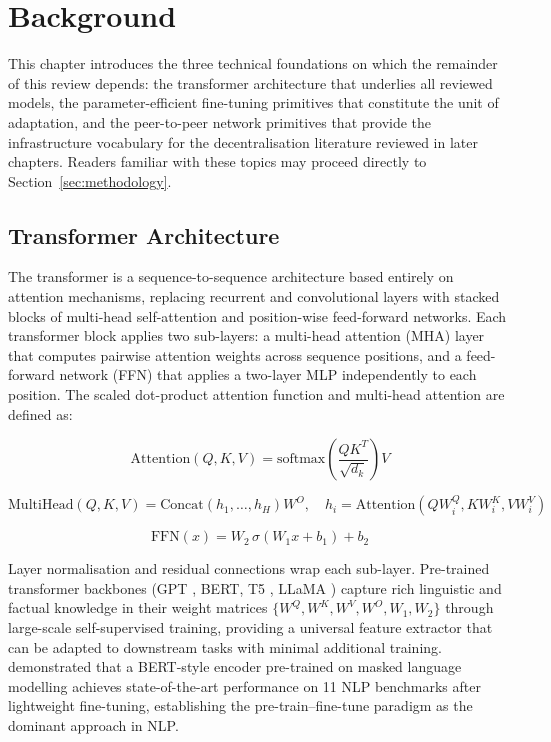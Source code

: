 \section{Background}
\label{sec:background}

This chapter introduces the three technical foundations on which the
remainder of this review depends: the transformer architecture that underlies
all reviewed models, the parameter-efficient fine-tuning primitives that
constitute the unit of adaptation, and the peer-to-peer network primitives
that provide the infrastructure vocabulary for the decentralisation
literature reviewed in later chapters. Readers familiar with these topics
may proceed directly to Section~\ref{sec:methodology}.

\subsection{Transformer Architecture}
\label{sec:background:transformer}

The transformer \citep{Vaswani2017} is a sequence-to-sequence architecture based
entirely on attention mechanisms, replacing recurrent and convolutional layers with
stacked blocks of multi-head self-attention and position-wise feed-forward networks.
Each transformer block applies two sub-layers: a multi-head attention (MHA) layer
that computes pairwise attention weights across sequence positions, and a feed-forward
network (FFN) that applies a two-layer MLP independently to each position. The
scaled dot-product attention function and multi-head attention are defined as:

\begin{equation}
\mathrm{Attention}(Q,K,V) = \mathrm{softmax}\!\left(\frac{Q K^T}{\sqrt{d_k}}\right) V
\label{eq:attention}
\end{equation}

\begin{equation}
\mathrm{MultiHead}(Q,K,V) = \mathrm{Concat}(h_1,\ldots,h_H) W^O,
\quad h_i = \mathrm{Attention}(Q W^Q_i, K W^K_i, V W^V_i)
\label{eq:mha}
\end{equation}

\begin{equation}
\text{FFN}(x) = W_2 \, \sigma(W_1 x + b_1) + b_2
\label{eq:ffn}
\end{equation}

Layer normalisation and residual connections wrap each sub-layer. Pre-trained
transformer backbones (GPT \citep{RadfordGPT22019,BrownGPT32020}, BERT, T5 \citep{RaffelT52020}, LLaMA \citep{TouvronLLaMA2023}) capture rich linguistic and factual
knowledge in their weight matrices $\{W^Q, W^K, W^V, W^O, W_1, W_2\}$ through
large-scale self-supervised training, providing a universal feature extractor that
can be adapted to downstream tasks with minimal additional training. \citet{Devlin2019}
demonstrated that a BERT-style encoder pre-trained on masked language modelling
achieves state-of-the-art performance on 11 NLP benchmarks after lightweight
fine-tuning, establishing the pre-train--fine-tune paradigm as the dominant approach
in NLP.


